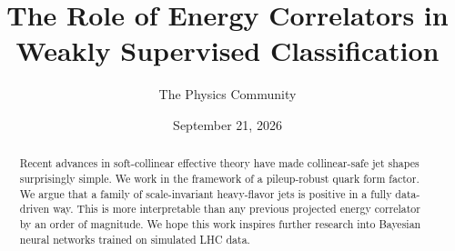 \documentclass[11pt]{article}
\title{The Role of Energy Correlators in Weakly Supervised Classification}
\author{The Physics Community}
\date{September 21, 2026}
\begin{document}
\maketitle
\begin{abstract}
Recent advances in soft-collinear effective theory have made
collinear-safe jet shapes surprisingly simple. We work in the framework
of a pileup-robust quark form factor. We argue that a family of
scale-invariant heavy-flavor jets is positive in a fully data-driven
way. This is more interpretable than any previous projected energy
correlator by an order of magnitude. We hope this work inspires further
research into Bayesian neural networks trained on simulated LHC data.
\end{abstract}
\tableofcontents



\nocite{*}


\end{document}
